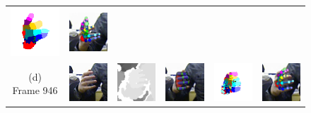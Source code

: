 \begin{figure}
\begin{tabular}{@{}cc@{}c@{}c@{}c@{}c@{}}
		\includegraphics[width=2.35cm]{fig/hand/qual/class/class-825.png} &
		\includegraphics[width=2.35cm]{fig/hand/qual/vote/image_0825.png}
		\label{fig/hand/multi3} \\
		\raisebox{1cm}{\parbox{2cm}{\centering (d)\\Frame 946}} & 
		\includegraphics[width=2.35cm]{fig/hand/qual/rgb/image_0946.png} &
		\includegraphics[width=2.35cm]{fig/hand/qual/depth/image_0946.png} &
		\includegraphics[width=2.35cm]{fig/hand/qual/forth/image_0946.png} &
		\includegraphics[width=2.35cm]{fig/hand/qual/class/class-946.png} &
		\includegraphics[width=2.35cm]{fig/hand/qual/vote/image_0946.png}

\end{tabular}
\end{figure}

